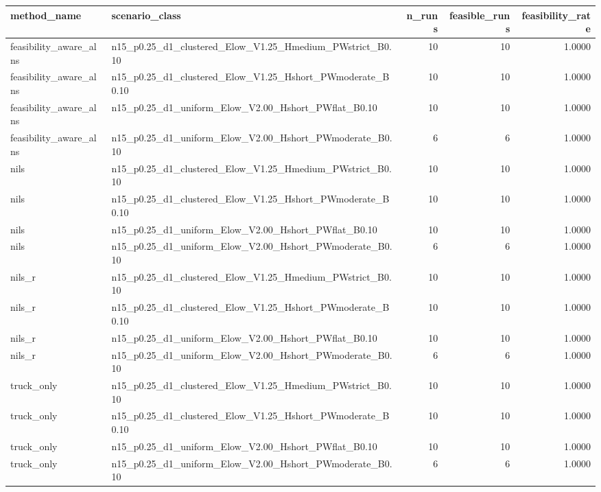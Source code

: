 \begin{tabular}{llrrr}
\toprule
method_name & scenario_class & n_runs & feasible_runs & feasibility_rate \\
\midrule
feasibility_aware_alns & n15_p0.25_d1_clustered_Elow_V1.25_Hmedium_PWstrict_B0.10 & 10 & 10 & 1.0000 \\
feasibility_aware_alns & n15_p0.25_d1_clustered_Elow_V1.25_Hshort_PWmoderate_B0.10 & 10 & 10 & 1.0000 \\
feasibility_aware_alns & n15_p0.25_d1_uniform_Elow_V2.00_Hshort_PWflat_B0.10 & 10 & 10 & 1.0000 \\
feasibility_aware_alns & n15_p0.25_d1_uniform_Elow_V2.00_Hshort_PWmoderate_B0.10 & 6 & 6 & 1.0000 \\
nils & n15_p0.25_d1_clustered_Elow_V1.25_Hmedium_PWstrict_B0.10 & 10 & 10 & 1.0000 \\
nils & n15_p0.25_d1_clustered_Elow_V1.25_Hshort_PWmoderate_B0.10 & 10 & 10 & 1.0000 \\
nils & n15_p0.25_d1_uniform_Elow_V2.00_Hshort_PWflat_B0.10 & 10 & 10 & 1.0000 \\
nils & n15_p0.25_d1_uniform_Elow_V2.00_Hshort_PWmoderate_B0.10 & 6 & 6 & 1.0000 \\
nils_r & n15_p0.25_d1_clustered_Elow_V1.25_Hmedium_PWstrict_B0.10 & 10 & 10 & 1.0000 \\
nils_r & n15_p0.25_d1_clustered_Elow_V1.25_Hshort_PWmoderate_B0.10 & 10 & 10 & 1.0000 \\
nils_r & n15_p0.25_d1_uniform_Elow_V2.00_Hshort_PWflat_B0.10 & 10 & 10 & 1.0000 \\
nils_r & n15_p0.25_d1_uniform_Elow_V2.00_Hshort_PWmoderate_B0.10 & 6 & 6 & 1.0000 \\
truck_only & n15_p0.25_d1_clustered_Elow_V1.25_Hmedium_PWstrict_B0.10 & 10 & 10 & 1.0000 \\
truck_only & n15_p0.25_d1_clustered_Elow_V1.25_Hshort_PWmoderate_B0.10 & 10 & 10 & 1.0000 \\
truck_only & n15_p0.25_d1_uniform_Elow_V2.00_Hshort_PWflat_B0.10 & 10 & 10 & 1.0000 \\
truck_only & n15_p0.25_d1_uniform_Elow_V2.00_Hshort_PWmoderate_B0.10 & 6 & 6 & 1.0000 \\
\bottomrule
\end{tabular}
